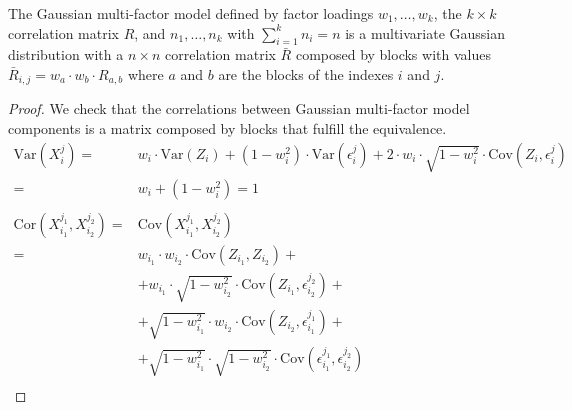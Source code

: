 \documentclass[11pt,fleqn]{book} %
\begin{document}
\begin{proposition}
	\label{prop:gmfigs}
	The Gaussian multi-factor model defined by factor loadings 
	$w_1,\dots,w_k$, the $k \times k$ correlation matrix $R$, and
	$n_1,\dots,n_k$ with $\sum_{i=1}^k n_i = n$ is a 
	multivariate Gaussian distribution with a $n \times n$ correlation
	matrix $\bar{R}$ composed by blocks with values
	$\bar{R}_{i,j} = w_a \cdot w_b \cdot R_{a,b}$ where $a$ and $b$ 
	are the blocks of the indexes $i$ and $j$.
\end{proposition}
\begin{proof}
	We check that the correlations between Gaussian multi-factor model
	components is a matrix composed by blocks that fulfill the equivalence.
	\begin{displaymath}
		\begin{array}{rl}
			\text{Var}(X_i^j) =                       &                                                                                                            
			w_i \cdot \text{Var}(Z_i) + (1-w_i^2) \cdot \text{Var}(\epsilon_i^j) +
			2 \cdot w_i \cdot \sqrt{1-w_i^2} \cdot \text{Cov}(Z_i, \epsilon_i^j) \\
			=                                         & w_i + (1-w_i^2) = 1                                                                                        \\
			                                          &                                                                                                            \\
			\text{Cor}(X_{i_1}^{j_1},X_{i_2}^{j_2}) = & \text{Cov}(X_{i_1}^{j_1},X_{i_2}^{j_2})                                                                    \\
			=                                         & w_{i_1} \cdot w_{i_2} \cdot \text{Cov}(Z_{i_1},Z_{i_2}) +                                                  \\
			                                          & + w_{i_1} \cdot \sqrt{1-w_{i_2}^2} \cdot \text{Cov}(Z_{i_1}, \epsilon_{i_2}^{j_2}) +                       \\
			                                          & + \sqrt{1-w_{i_1}^2} \cdot w_{i_2} \cdot \text{Cov}(Z_{i_2}, \epsilon_{i_1}^{j_1}) +                       \\
			                                          & + \sqrt{1-w_{i_1}^2} \cdot \sqrt{1-w_{i_2}^2} \cdot \text{Cov}(\epsilon_{i_1}^{j_1}, \epsilon_{i_2}^{j_2}) \\

\end{array}
\end{displaymath}
\end{proof}
\end{document}
